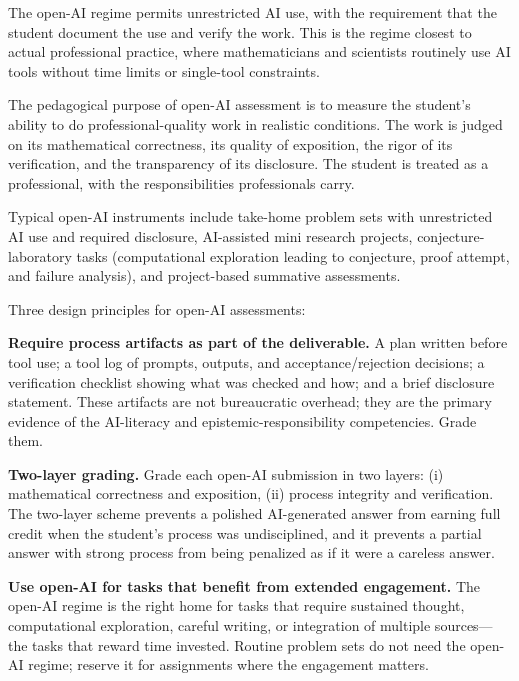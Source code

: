 \documentclass[11pt]{book}
\begin{document}
The open-AI regime permits unrestricted AI use, with the requirement that the student document the use and verify the work. This is the regime closest to actual professional practice, where mathematicians and scientists routinely use AI tools without time limits or single-tool constraints.

The pedagogical purpose of open-AI assessment is to measure the student's ability to do professional-quality work in realistic conditions. The work is judged on its mathematical correctness, its quality of exposition, the rigor of its verification, and the transparency of its disclosure. The student is treated as a professional, with the responsibilities professionals carry.

Typical open-AI instruments include take-home problem sets with unrestricted AI use and required disclosure, AI-assisted mini research projects, conjecture-laboratory tasks (computational exploration leading to conjecture, proof attempt, and failure analysis), and project-based summative assessments.

Three design principles for open-AI assessments:

\textbf{Require process artifacts as part of the deliverable.} A plan written before tool use; a tool log of prompts, outputs, and acceptance/rejection decisions; a verification checklist showing what was checked and how; and a brief disclosure statement. These artifacts are not bureaucratic overhead; they are the primary evidence of the AI-literacy and epistemic-responsibility competencies. Grade them.

\textbf{Two-layer grading.} Grade each open-AI submission in two layers: (i) mathematical correctness and exposition, (ii) process integrity and verification. The two-layer scheme prevents a polished AI-generated answer from earning full credit when the student's process was undisciplined, and it prevents a partial answer with strong process from being penalized as if it were a careless answer.

\textbf{Use open-AI for tasks that benefit from extended engagement.} The open-AI regime is the right home for tasks that require sustained thought, computational exploration, careful writing, or integration of multiple sources---the tasks that reward time invested. Routine problem sets do not need the open-AI regime; reserve it for assignments where the engagement matters.
\end{document}
